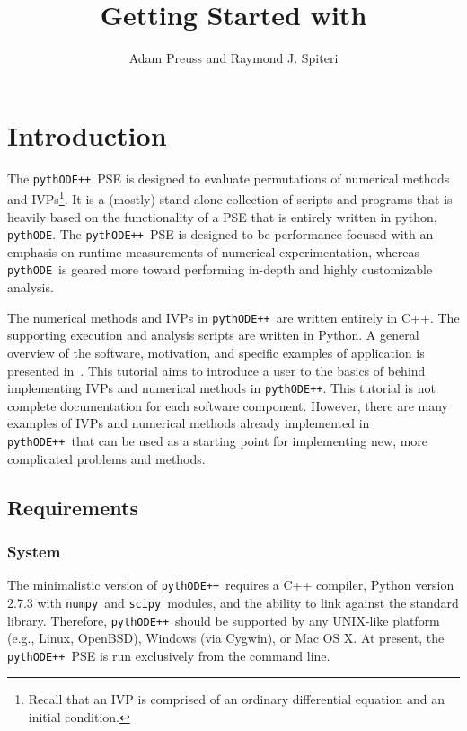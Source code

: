 \documentclass[11pt]{article}
\title{Getting Started with \pypp}
\author{Adam Preuss and Raymond J. Spiteri}
\newcommand{\pythode}{\texttt{pythODE}}
\newcommand{\pypp}{\texttt{pythODE++}}
\newcommand{\numpy}{\texttt{numpy}}
\newcommand{\scipy}{\texttt{scipy}}
\begin{document}
\maketitle

\section{Introduction}
\label{sec:intro}

The \pypp\ \ac{PSE} is designed to evaluate permutations of numerical
methods and \acp{IVP}\footnote{Recall that an \ac{IVP} is comprised of
  an ordinary differential equation and an initial condition.}.  It is
a (mostly) stand-alone collection of scripts and programs that is
heavily based on the functionality of a PSE that is entirely written
in python, \pythode.  The \pypp\ PSE is designed to be
performance-focused with an emphasis on runtime measurements of
numerical experimentation, whereas \pythode\ is geared more toward
performing in-depth and highly customizable analysis.

The numerical methods and \acp{IVP} in \pypp\ are written entirely in
C++. The supporting execution and analysis scripts are written in
Python. A general overview of the software, motivation, and specific
examples of application is presented in~\cite{preuss14}.  This
tutorial aims to introduce a user to the basics of behind implementing
\acp{IVP} and numerical methods in \pypp.  This tutorial is not
complete documentation for each software component.  However, there
are many examples of \acp{IVP} and numerical methods already
implemented in \pypp\ that can be used as a starting point for
implementing new, more complicated problems and methods.

\subsection{Requirements}

\subsubsection{System}

The minimalistic version of \pypp\ requires a C++ compiler, Python
version 2.7.3 with \numpy\ and \scipy\ modules, and the ability to
link against the standard library. Therefore, \pypp\ should be
supported by any UNIX-like platform (e.g., Linux, OpenBSD), Windows
(via Cygwin), or Mac OS X. At present, the \pypp\ PSE is run
exclusively from the command line.
\end{document}
